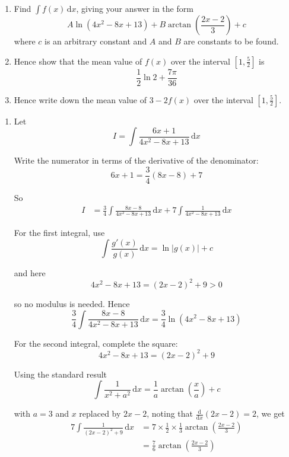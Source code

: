 \documentclass[leqno]{article}
\begin{document}
\begin{enumerate}[
  label=\textbf{\arabic*.},
  leftmargin=*,
  topsep=0pt,
  partopsep=0pt,
  parsep=0pt
]
\begin{enumerate}[label=\textbf{(\alph*)}]
  \item Find $\int f(x)\,\mathrm{d}x$, giving your answer in the form \[A\ln(4x^2-8x+13)+B\arctan\left(\frac{2x-2}{3}\right)+c\] where $c$ is an arbitrary constant and $A$ and $B$ are constants to be found.  \\
  \item Hence show that the mean value of $f(x)$ over the interval $\left[1,\frac{5}{2}\right]$ is \[\frac{1}{2}\ln 2+\frac{7\pi}{36}\]  
  \item Hence write down the mean value of $3-2f(x)$ over the interval $\left[1,\frac{5}{2}\right]$.  \\
\end{enumerate}

\vspace*{10pt}

\begin{djsSolution}
\begin{enumerate}[label=\textbf{(\alph*)}]
  \item Let
\[
I=\int \frac{6x+1}{4x^2-8x+13}\,\mathrm{d}x
\]

Write the numerator in terms of the derivative of the denominator:
\[
6x+1=\frac34(8x-8)+7
\]

So
\begin{align*}
I
&=\frac34\int \frac{8x-8}{4x^2-8x+13}\,\mathrm{d}x
+7\int \frac{1}{4x^2-8x+13}\,\mathrm{d}x
\end{align*}

For the first integral, use
\[
\int \frac{g'(x)}{g(x)}\,\mathrm{d}x=\ln|g(x)|+c
\]

and here
\[
4x^2-8x+13=(2x-2)^2+9>0
\]

so no modulus is needed. Hence
\[
\frac34\int \frac{8x-8}{4x^2-8x+13}\,\mathrm{d}x
=\frac34\ln(4x^2-8x+13)
\]

For the second integral, complete the square:
\[
4x^2-8x+13=(2x-2)^2+9
\]

Using the standard result
\[
\int \frac{1}{x^2+a^2}\,\mathrm{d}x=\frac{1}{a}\arctan\left(\frac{x}{a}\right)+c
\]

with \(a=3\) and \(x\) replaced by \(2x-2\), noting that \(\frac{\mathrm{d}}{\mathrm{d}x}(2x-2)=2\), we get
\begin{align*}
7\int \frac{1}{(2x-2)^2+9}\,\mathrm{d}x
&=7\times\frac12\times\frac13\arctan\left(\frac{2x-2}{3}\right) \\
&=\frac76 \arctan\left(\frac{2x-2}{3}\right)
\end{align*}


\end{enumerate}
\end{djsSolution}
\end{enumerate}
\end{document}
